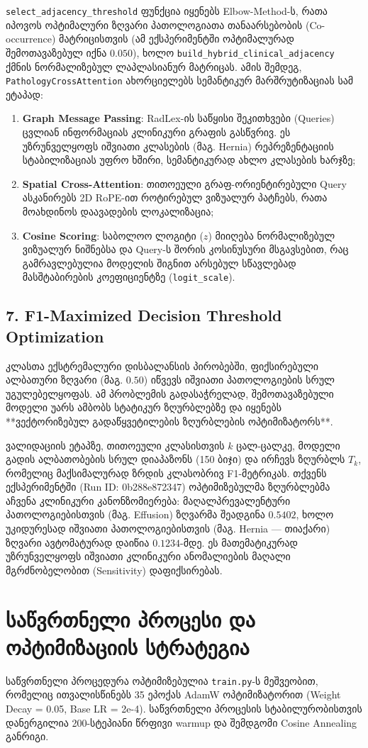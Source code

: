 \documentclass[12pt,a4paper,oneside]{report}
\begin{document}
\texttt{select\_adjacency\_threshold} ფუნქცია იყენებს Elbow-Method-ს, რათა იპოვოს ოპტიმალური ზღვარი პათოლოგიათა თანაარსებობის (Co-occurrence) მატრიცისთვის (ამ ექსპერიმენტში ოპტიმალურად შემოთავაზებულ იქნა $0.050$), ხოლო \texttt{build\_hybrid\_clinical\_adjacency} ქმნის ნორმალიზებულ ლაპლასიანურ მატრიცას. ამის შემდეგ, \texttt{PathologyCrossAttention} ახორციელებს სემანტიკურ მარშრუტიზაციას სამ ეტაპად:
\begin{enumerate}[leftmargin=1.6em]
    \item \textbf{Graph Message Passing}: RadLex-ის საწყისი შეკითხვები (Queries) ცვლიან ინფორმაციას კლინიკური გრაფის გასწვრივ. ეს უზრუნველყოფს იშვიათი კლასების (მაგ. Hernia) რეპრეზენტაციის სტაბილიზაციას უფრო ხშირი, სემანტიკურად ახლო კლასების ხარჯზე;
    \item \textbf{Spatial Cross-Attention}: თითოეული გრაფ-ორიენტირებული Query ასკანირებს 2D RoPE-ით როტირებულ ვიზუალურ პატჩებს, რათა მოახდინოს დაავადების ლოკალიზაცია;
    \item \textbf{Cosine Scoring}: საბოლოო ლოგიტი ($z$) მიიღება ნორმალიზებულ ვიზუალურ ნიშნებსა და Query-ს შორის კოსინუსური მსგავსებით, რაც გამრავლებულია მოდელის შიგნით არსებულ სწავლებად მასშტაბირების კოეფიციენტზე (\texttt{logit\_scale}).
\end{enumerate}

\subsection{7. F1-Maximized Decision Threshold Optimization}
კლასთა ექსტრემალური დისბალანსის პირობებში, ფიქსირებული ალბათური ზღვარი (მაგ. $0.50$) იწვევს იშვიათი პათოლოგიების სრულ უგულებელყოფას. ამ პრობლემის გადასაჭრელად, შემოთავაზებული მოდელი უარს ამბობს სტატიკურ ზღურბლებზე და იყენებს **ვექტორიზებულ გადაწყვეტილების ზღურბლების ოპტიმიზატორს**.

ვალიდაციის ეტაპზე, თითოეული კლასისთვის $k$ ცალ-ცალკე, მოდელი გადის ალბათობების სრულ დიაპაზონს (150 ბიჯი) და ირჩევს ზღურბლს $T_k$, რომელიც მაქსიმალურად ზრდის კლასობრივ F1-მეტრიკას. თქვენს ექსპერიმენტში (Run ID: 0b288e872347) ოპტიმიზებულმა ზღურბლებმა აჩვენა კლინიკური კანონზომიერება: მაღალპრევალენტური პათოლოგიებისთვის (მაგ. Effusion) ზღვარმა შეადგინა $0.5402$, ხოლო უკიდურესად იშვიათი პათოლოგიებისთვის (მაგ. Hernia — თიაქარი) ზღვარი ავტომატურად დაიწია $0.1234$-მდე. ეს მათემატიკურად უზრუნველყოფს იშვიათი კლინიკური ანომალიების მაღალი მგრძნობელობით (Sensitivity) დაფიქსირებას.

\section{საწვრთნელი პროცესი და ოპტიმიზაციის სტრატეგია}
საწვრთნელი პროცედურა ოპტიმიზებულია \texttt{train.py}-ს მეშვეობით, რომელიც ითვალისწინებს 35 ეპოქას AdamW ოპტიმიზატორით (Weight Decay = 0.05, Base LR = 2e-4). საწვრთნელი პროცესის სტაბილურობისთვის დანერგილია 200-სტეპიანი წრფივი warmup და შემდგომი Cosine Annealing განრიგი.
\end{document}

